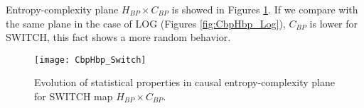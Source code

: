 Entropy-complexity plane $H_{BP} \times C_{BP}$ is showed in Figures \ref{fig:SWITCH_HC}.
If we compare with the same plane in the case of LOG (Figures \ref{fig:CbpHbp_Log}), $C_{BP}$ is lower for SWITCH, this fact shows a more random behavior.
%
\begin{figure}[H]
	\centering
	\texttt{[image: CbpHbp\_Switch]}
	\caption{Evolution of statistical properties in causal entropy-complexity plane for SWITCH map $H_{BP} \times C_{BP}$.}
	\label{fig:SWITCH_HC}
\end{figure}